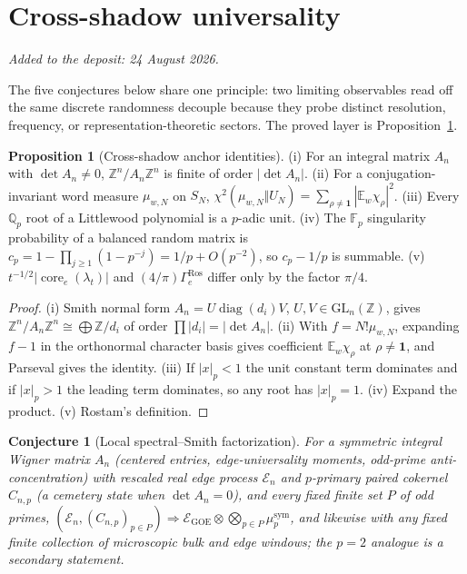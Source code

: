 \documentclass[11pt]{article}
\newtheorem{conjecture}{Conjecture}
\theoremstyle{definition}
\newcommand{\E}{\mathbb E}
\newcommand{\Z}{\mathbb Z}
\newcommand{\Q}{\mathbb Q}
\providecommand{\Z}{\mathbb Z}
\providecommand{\Q}{\mathbb Q}
\providecommand{\E}{\mathbb E}
\newtheorem{proposition}{Proposition}
\begin{document}
\part{Cross-shadow universality}

\medskip\noindent\emph{Added to the deposit: 24 August 2026.}\par\medskip

The five conjectures below share one principle: two limiting observables read off the same discrete randomness decouple because they probe distinct resolution, frequency, or representation-theoretic sectors.  The proved layer is Proposition~\ref{ap:basic}.

\begin{proposition}[Cross-shadow anchor identities]\label{ap:basic}
{\rm(i)} For an integral matrix $A_n$ with $\det A_n\ne0$, $\Z^n/A_n\Z^n$ is finite of order $|\det A_n|$.  {\rm(ii)} For a conjugation-invariant word measure $\mu_{w,N}$ on $S_N$, $\chi^2(\mu_{w,N}\Vert U_N)=\sum_{\rho\ne\mathbf1}|\E_w\chi_\rho|^2$.  {\rm(iii)} Every $\Q_p$ root of a Littlewood polynomial is a $p$-adic unit.  {\rm(iv)} The $\mathbb F_p$ singularity probability of a balanced random matrix is $c_p=1-\prod_{j\ge1}(1-p^{-j})=1/p+O(p^{-2})$, so $c_p-1/p$ is summable.  {\rm(v)} $t^{-1/2}|\operatorname{core}_e(\lambda_t)|$ and $(4/\pi)\Gamma_e^{\mathrm{Ros}}$ differ only by the factor $\pi/4$.
\end{proposition}

\begin{proof}
{\rm(i)} Smith normal form $A_n=U\operatorname{diag}(d_i)V$, $U,V\in\mathrm{GL}_n(\Z)$, gives $\Z^n/A_n\Z^n\cong\bigoplus\Z/d_i$ of order $\prod|d_i|=|\det A_n|$.  {\rm(ii)} With $f=N!\mu_{w,N}$, expanding $f-1$ in the orthonormal character basis gives coefficient $\E_w\chi_\rho$ at $\rho\ne\mathbf1$, and Parseval gives the identity.  {\rm(iii)} If $|x|_p<1$ the unit constant term dominates and if $|x|_p>1$ the leading term dominates, so any root has $|x|_p=1$.  {\rm(iv)} Expand the product.  {\rm(v)} Rostam's definition.
\end{proof}

\begin{conjecture}[Local spectral--Smith factorization]\label{ap1}
For a symmetric integral Wigner matrix $A_n$ (centered entries, edge-universality moments, odd-prime anti-concentration) with rescaled real edge process $\mathcal E_n$ and $p$-primary paired cokernel $C_{n,p}$ (a cemetery state when $\det A_n=0$), and every fixed finite set $P$ of odd primes, $(\mathcal E_n,(C_{n,p})_{p\in P})\Rightarrow\mathcal E_{\mathrm{GOE}}\otimes\bigotimes_{p\in P}\mu_p^{\mathrm{sym}}$, and likewise with any fixed finite collection of microscopic bulk and edge windows; the $p=2$ analogue is a secondary statement.
\end{conjecture}
\end{document}
